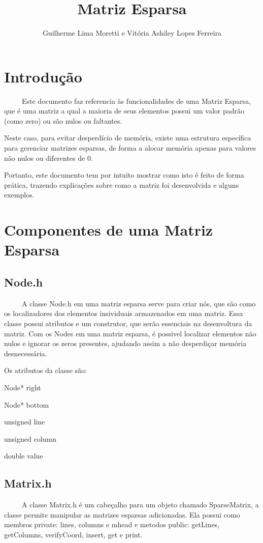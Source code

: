\documentclass{article}
\title{Matriz Esparsa}
\author{Guilherme Lima Moretti e Vitória Ashiley Lopes Ferreira}
\begin{document}
\maketitle

\section{Introdução}

~~~~~Este documento faz referencia às funcionalidades de uma Matriz Esparsa, que é uma matriz a qual a maioria de seus elementos possui um valor padrão (como zero) ou são nulos ou faltantes.

Neste caso, para evitar desperdício de memória, existe uma estrutura específica para gerenciar matrizes esparsas, de forma a alocar memória apenas para valores não nulos ou diferentes de 0.

Portanto, este documento tem por intuito mostrar como isto é feito de forma prática, trazendo explicações sobre como a matriz foi desenvolvida e alguns exemplos.

\section{Componentes de uma Matriz Esparsa}

\subsection{Node.h}

~~~~~A classe Node.h em uma matriz esparsa serve para criar nós, que são como os localizadores dos elementos insividuais armazenados em uma matriz. Essa classe possui atributos e um construtor, que serão essenciais na desenvoltura da matriz. Com os Nodes em uma matriz esparsa, é possivel localizar elementos não nulos e ignorar os zeros presentes, ajudando assim a não desperdiçar memória desnecessária.

Os atributos da classe são:

Node* right

Node* bottom

unsigned line

unsigned column

double value

\subsection{Matrix.h}

~~~~~A classe Matrix.h é um cabeçalho para um objeto chamado SparseMatrix, a classe permite manipular as matrizes esparsas adicionadas. Ela possui como membros private: lines, columns e mhead e metodos public: getLines, getColumns, verifyCoord, insert, get e print.
\end{document}
